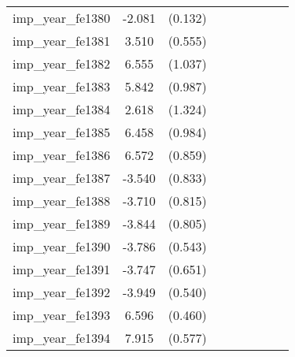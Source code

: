 {\begin{tabular}{l*{4}{cc}}
imp\_year\_fe1380&   -2.081\sym{***}&  (0.132)&                  &         &                  &         &                  &         \\
imp\_year\_fe1381&    3.510\sym{***}&  (0.555)&                  &         &                  &         &                  &         \\
imp\_year\_fe1382&    6.555\sym{***}&  (1.037)&                  &         &                  &         &                  &         \\
imp\_year\_fe1383&    5.842\sym{***}&  (0.987)&                  &         &                  &         &                  &         \\
imp\_year\_fe1384&    2.618\sym{*}  &  (1.324)&                  &         &                  &         &                  &         \\
imp\_year\_fe1385&    6.458\sym{***}&  (0.984)&                  &         &                  &         &                  &         \\
imp\_year\_fe1386&    6.572\sym{***}&  (0.859)&                  &         &                  &         &                  &         \\
imp\_year\_fe1387&   -3.540\sym{***}&  (0.833)&                  &         &                  &         &                  &         \\
imp\_year\_fe1388&   -3.710\sym{***}&  (0.815)&                  &         &                  &         &                  &         \\
imp\_year\_fe1389&   -3.844\sym{***}&  (0.805)&                  &         &                  &         &                  &         \\
imp\_year\_fe1390&   -3.786\sym{***}&  (0.543)&                  &         &                  &         &                  &         \\
imp\_year\_fe1391&   -3.747\sym{***}&  (0.651)&                  &         &                  &         &                  &         \\
imp\_year\_fe1392&   -3.949\sym{***}&  (0.540)&                  &         &                  &         &                  &         \\
imp\_year\_fe1393&    6.596\sym{***}&  (0.460)&                  &         &                  &         &                  &         \\
imp\_year\_fe1394&    7.915\sym{***}&  (0.577)&                  &         &                  &         &                  &         \\

\end{tabular}}
